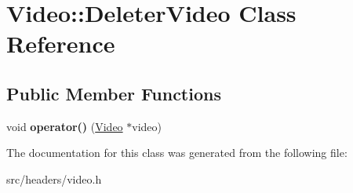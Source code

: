 \hypertarget{class_video_1_1_deleter_video}{\section{Video\-:\-:Deleter\-Video Class Reference}
\label{class_video_1_1_deleter_video}
}
\subsection*{Public Member Functions}
\begin{DoxyCompactItemize}
\item 
\hypertarget{class_video_1_1_deleter_video_ae17aba9c9ad3c1b66d8ce7382cb83496}{void {\bfseries operator()} (\hyperlink{class_video}{Video} $\ast$video)}\label{class_video_1_1_deleter_video_ae17aba9c9ad3c1b66d8ce7382cb83496}

\end{DoxyCompactItemize}


The documentation for this class was generated from the following file\-:\begin{DoxyCompactItemize}
\item 
src/headers/video.\-h\end{DoxyCompactItemize}
